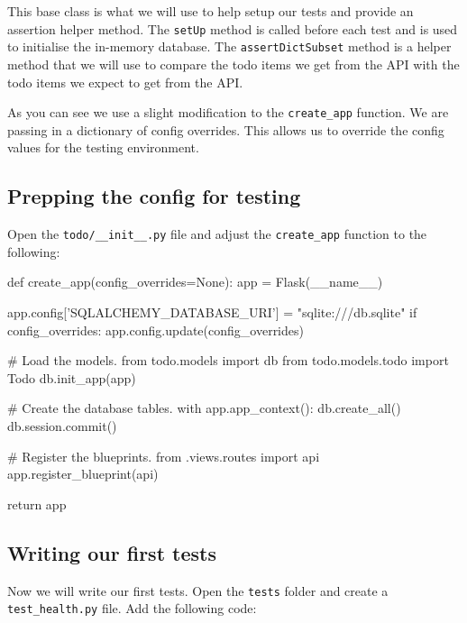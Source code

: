 \documentclass{csse4400}
\begin{document}
This base class is what we will use to help setup our tests and provide an assertion helper method.
The \texttt{setUp} method is called before each test and is used to initialise the in-memory database.
The \texttt{assertDictSubset} method is a helper method that we will use to compare the todo items we get from the API with the todo items we expect to get from the API.

As you can see we use a slight modification to the \texttt{create\_app} function.
We are passing in a dictionary of config overrides.
This allows us to override the config values for the testing environment.

\subsection{Prepping the config for testing}

Open the \texttt{todo/\_\_init\_\_.py} file and adjust the \texttt{create\_app} function to the following:

\begin{code}[language=python,numbers=none]{}
  def create_app(config_overrides=None):
      app = Flask(__name__)
  
      app.config['SQLALCHEMY_DATABASE_URI'] = "sqlite:///db.sqlite"
      if config_overrides:
          app.config.update(config_overrides)
          
      # Load the models.
      from todo.models import db
      from todo.models.todo import Todo
      db.init_app(app)

\end{code}

\begin{code}[language=python,numbers=none]{}
      # Create the database tables.
      with app.app_context():
          db.create_all()
          db.session.commit()
  
      # Register the blueprints.
      from .views.routes import api
      app.register_blueprint(api)
  
      return app
\end{code}

\subsection{Writing our first tests}

Now we will write our first tests.
Open the \texttt{tests} folder and create a \texttt{test\_health.py} file.
Add the following code:
\end{document}

